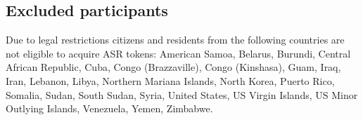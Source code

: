 \subsection{Excluded participants}
Due to legal restrictions citizens and residents from the following countries are not eligible to acquire ASR tokens: American Samoa, Belarus, Burundi, Central African Republic, Cuba, Congo (Brazzaville), Congo (Kinshasa), Guam, Iraq, Iran, Lebanon, Libya, Northern Mariana Islands, North Korea, Puerto Rico, Somalia, Sudan, South Sudan, Syria, United States, US Virgin Islands, US Minor Outlying Islands, Venezuela, Yemen, Zimbabwe.
